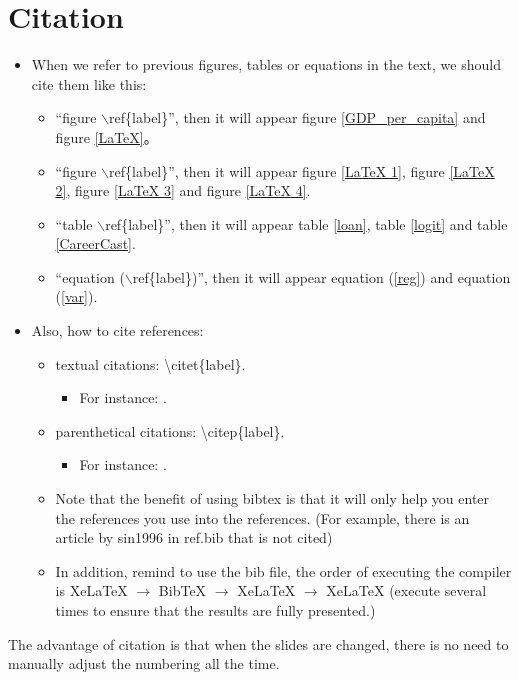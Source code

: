 \documentclass[utf8,12pt]{article} %
\begin{document}
\section{Citation}
%
%
\begin{spacing}{1.5}
%
\begin{itemize}
	\item When we refer to previous figures, tables or equations in the text, we should cite them like this:
	\begin{itemize}
		\item  ``figure $\backslash$ref\{label\}'',
			then it will appear figure \ref{GDP_per_capita} and figure \ref{LaTeX}。
		\item  ``figure $\backslash$ref\{label\}'',
			then it will appear figure \ref{LaTeX 1}, figure \ref{LaTeX 2}, figure \ref{LaTeX 3} and figure \ref{LaTeX 4}.
		\item ``table $\backslash$ref\{label\}'',
			then it will appear table \ref{loan}, table \ref{logit} and table \ref{CareerCast}.
		\item ``equation ($\backslash$ref\{label\})'',
			then it will appear equation (\ref{reg}) and equation (\ref{var}).
	\end{itemize}
	\item Also, how to cite references:
	\begin{itemize}
		\item textual citations: \textbackslash citet\{label\}.
		\begin{itemize}
			\item For instance: \citet{melitz2003}.
		\end{itemize}	
		\item parenthetical citations: \textbackslash citep\{label\}.
		\begin{itemize}
			\item For instance: \citep{melitz2003}.
		\end{itemize}
		\item Note that the benefit of using bibtex is that it will only help you enter the references you use into the references.
			(For example, there is an article by sin1996 in ref.bib that is not cited)
		\item In addition, remind to use the bib file, the order of executing the compiler is XeLaTeX $\rightarrow$ BibTeX $\rightarrow$ XeLaTeX $\rightarrow$ XeLaTeX
			(execute several times to ensure that the results are fully presented.)
	\end{itemize}	
\end{itemize}

The advantage of citation is that when the slides are changed, there is no need to manually adjust the numbering all the time.
%
\end{spacing}
\end{document}
